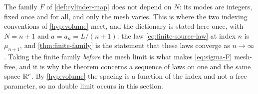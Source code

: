 \begin{remark}\label{rem:index-dictionary}
The family $F$ of \cref{def:cylinder-map} does not depend on $N$: its modes are
integers, fixed once and for all, and only the mesh varies. This is where the
two indexing conventions of \cref{hyp:volume} meet, and the dictionary is stated
here once, with $N=n+1$ and $a=a_n=L/(n+1)$: the law
\eqref{eq:finite-source-law} at index $n$ is $\mu_{n+1}$, and
\cref{thm:finite-family} is the statement that these laws converge as
$n\to\infty$. Taking the finite family \emph{before} the mesh limit is what
makes \eqref{eq:sigma-F} mesh-free, and it is why the theorem concerns a
sequence of laws on one and the same space $\mathbb{R}^r$. By \cref{hyp:volume} the
spacing is a function of the index and not a free parameter, so no double limit
occurs in this section.
\end{remark}

